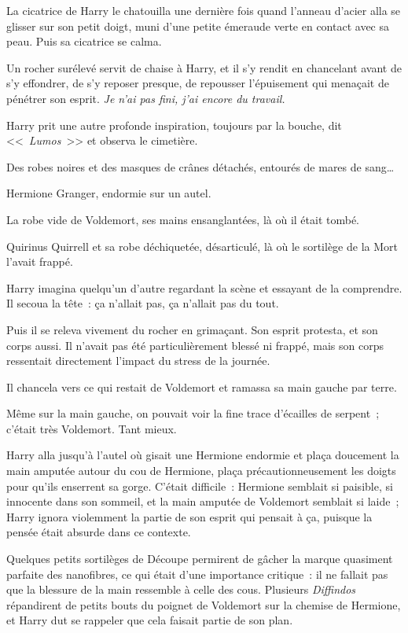 La cicatrice de Harry le chatouilla une dernière fois quand l'anneau d'acier alla se glisser sur son petit doigt, muni d'une petite émeraude verte en contact avec sa peau. Puis sa cicatrice se calma.

Un rocher surélevé servit de chaise à Harry, et il s'y rendit en chancelant avant de s'y effondrer, de s'y reposer presque, de repousser l'épuisement qui menaçait de pénétrer son esprit. \emph{Je n'ai pas fini, j'ai encore du travail.}

Harry prit une autre profonde inspiration, toujours par la bouche, dit <<~\emph{Lumos}~>> et observa le cimetière.

Des robes noires et des masques de crânes détachés, entourés de mares de sang…

Hermione Granger, endormie sur un autel.

La robe vide de Voldemort, ses mains ensanglantées, là où il était tombé.

Quirinus Quirrell et sa robe déchiquetée, désarticulé, là où le sortilège de la Mort l'avait frappé.

Harry imagina quelqu'un d'autre regardant la scène et essayant de la comprendre. Il secoua la tête~: ça n'allait pas, ça n'allait pas du tout.

Puis il se releva vivement du rocher en grimaçant. Son esprit protesta, et son corps aussi. Il n'avait pas été particulièrement blessé ni frappé, mais son corps ressentait directement l'impact du stress de la journée.

Il chancela vers ce qui restait de Voldemort et ramassa sa main gauche par terre.

Même sur la main gauche, on pouvait voir la fine trace d'écailles de serpent~; c'était très Voldemort. Tant mieux.

Harry alla jusqu'à l'autel où gisait une Hermione endormie et plaça doucement la main amputée autour du cou de Hermione, plaça précautionneusement les doigts pour qu'ils enserrent sa gorge. C'était difficile~: Hermione semblait si paisible, si innocente dans son sommeil, et la main amputée de Voldemort semblait si laide~; Harry ignora violemment la partie de son esprit qui pensait à ça, puisque la pensée était absurde dans ce contexte.

Quelques petits sortilèges de Découpe permirent de gâcher la marque quasiment parfaite des nanofibres, ce qui était d'une importance critique~: il ne fallait pas que la blessure de la main ressemble à celle des cous. Plusieurs \emph{Diffindos} répandirent de petits bouts du poignet de Voldemort sur la chemise de Hermione, et Harry dut se rappeler que cela faisait partie de son plan.

